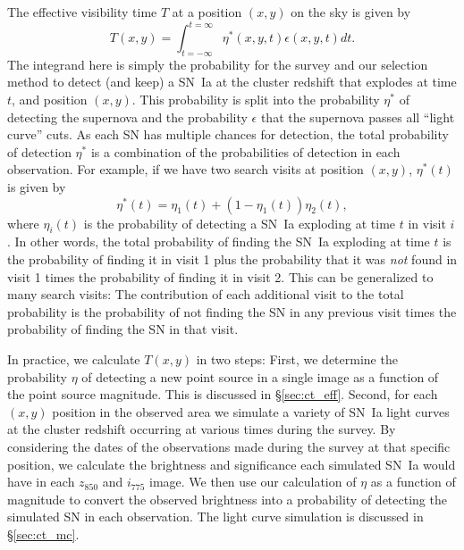 
The effective visibility time $T$ at a position $(x,y)$ on the 
sky is given by
\begin{equation}
T(x,y) = \int_{t=-\infty}^{t=\infty} \eta^\ast (x,y,t) \epsilon (x,y,t) dt.
\end{equation}
The integrand here is simply the probability for the survey and our
selection method to detect (and keep) a SN~Ia at the cluster redshift
that explodes at time $t$, and position $(x,y)$. This probability is
split into the probability $\eta^\ast$ of detecting the supernova and
the probability $\epsilon$ that the supernova passes all ``light
curve'' cuts. As each SN has multiple chances for detection, the total
probability of detection $\eta^\ast$ is a combination of the
probabilities of detection in each observation. For example, if we
have two search visits at position $(x,y)$, $\eta^\ast(t)$ is given by
\begin{equation}
\eta^\ast (t) = \eta_1 (t)+ ( 1-\eta_1(t) ) \eta_2 (t),
\end{equation}
where $\eta_i (t)$ is the probability of detecting a SN~Ia 
exploding at time $t$ in visit $i$. In other words, the total 
probability of finding the SN~Ia exploding at time $t$ is the probability 
of finding it in visit 1 plus the probability that it was \emph{not} found in
visit 1 times the probability of finding it in visit 2. This can be 
generalized to many search visits: The contribution of each additional visit 
to the total probability is the probability of not finding the SN in any 
previous visit times the probability of finding the SN in that visit.

In practice, we calculate $T(x,y)$ in two steps: First, we determine
the probability $\eta$ of detecting a new point source in a single
image as a function of the point source magnitude. This is discussed
in \S\ref{sec:ct_eff}. Second, for each $(x,y)$ position in the observed area
we simulate a variety of SN~Ia light curves at the cluster redshift
occurring at various times during the survey. By considering the dates
of the observations made during the survey at that specific position,
we calculate the brightness and significance each simulated SN~Ia would
have in each $z_{850}$ and $i_{775}$ image. We then use our
calculation of $\eta$ as a function of magnitude to convert the
observed brightness into a probability of detecting the simulated SN
in each observation. The light curve simulation is discussed in
\S\ref{sec:ct_mc}. 
